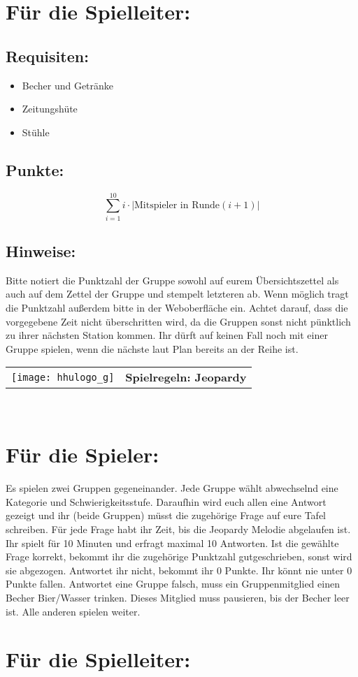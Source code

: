\documentclass[a4paper,10pt]{article}
\def\spielf{Jeopardy}
\newcommand{\unten}{
 Bitte notiert die Punktzahl der Gruppe sowohl auf eurem Übersichtszettel als auch auf dem Zettel der Gruppe und stempelt letzteren ab. Wenn möglich tragt die Punktzahl außerdem bitte in der Weboberfläche ein.
 Achtet darauf, dass die vorgegebene Zeit nicht überschritten wird, da die Gruppen sonst nicht pünktlich zu ihrer nächsten Station kommen. Ihr dürft auf keinen Fall noch mit einer Gruppe spielen, wenn die nächste laut Plan bereits an der Reihe ist.
}
\begin{document}
\section*{Für die Spielleiter:}
\subsection*{Requisiten:}
\begin{itemize}
 \item Becher und Getränke
 \item Zeitungshüte
 \item Stühle 
\end{itemize}
\subsection*{Punkte:}
$$\sum\limits_{i=1}^{10}i \cdot |\mbox{Mitspieler in Runde} (i+1)|$$

\subsection*{Hinweise:}
\unten

\newpage


  \begin{tabularx}{\textwidth}{lc}
    \texttt{[image: hhulogo\_g]}
  & {\Huge \textbf{Spielregeln: \spielf}}
  \end{tabularx}\\

\Large
\section*{Für die Spieler:}
Es spielen zwei Gruppen gegeneinander. Jede Gruppe wählt abwechselnd eine Kategorie und Schwierigkeitsstufe. Daraufhin wird euch allen eine Antwort gezeigt und ihr (beide Gruppen) müsst die zugehörige Frage auf eure Tafel schreiben. Für jede Frage habt ihr Zeit, bis die Jeopardy Melodie abgelaufen ist. Ihr spielt für 10 Minuten und erfragt maximal 10 Antworten. Ist die gewählte Frage korrekt, bekommt ihr die zugehörige Punktzahl gutgeschrieben, sonst wird sie abgezogen. Antwortet ihr nicht, bekommt ihr 0 Punkte. Ihr könnt nie unter 0 Punkte fallen. Antwortet eine Gruppe falsch, muss ein Gruppenmitglied einen Becher Bier/Wasser trinken. Dieses Mitglied muss pausieren, bis der Becher leer ist. Alle anderen spielen weiter.

\section*{Für die Spielleiter:}
\end{document}
